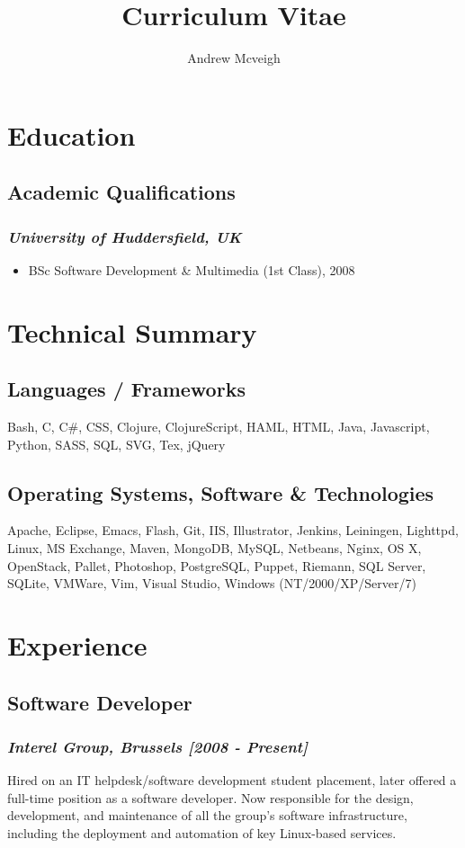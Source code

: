 \documentclass{article}
\title{Curriculum Vitae}
\author{Andrew Mcveigh}
\date{}
\begin{document}
\maketitle
\section*{Education}
\subsection*{Academic Qualifications}
\subsubsection*{\emph{University of Huddersfield, UK}}
\begin{itemize}
\item BSc Software Development \& Multimedia (1st Class), 2008
\end{itemize}
\section*{Technical Summary}
\subsection*{Languages / Frameworks}
Bash, C, C\#, CSS, Clojure, ClojureScript, HAML, HTML, Java, Javascript, Python, SASS, SQL, SVG, Tex, jQuery
\subsection*{Operating Systems, Software \& Technologies}
Apache, Eclipse, Emacs, Flash, Git, IIS, Illustrator, Jenkins, Leiningen, Lighttpd, Linux, MS Exchange, Maven, MongoDB, MySQL, Netbeans, Nginx, OS X, OpenStack, Pallet, Photoshop, PostgreSQL, Puppet, Riemann, SQL Server, SQLite, VMWare, Vim, Visual Studio, Windows (NT/2000/XP/Server/7)
\section*{Experience}
\subsection*{Software Developer}
\subsubsection*{\emph{Interel Group, Brussels  [2008 - Present]}}
Hired on an IT helpdesk/software development student placement,
          later offered a full-time position as a software developer. Now
          responsible for the design, development, and maintenance of all the
          group's software infrastructure, including the deployment
          and automation of key Linux-based services.
\end{document}
